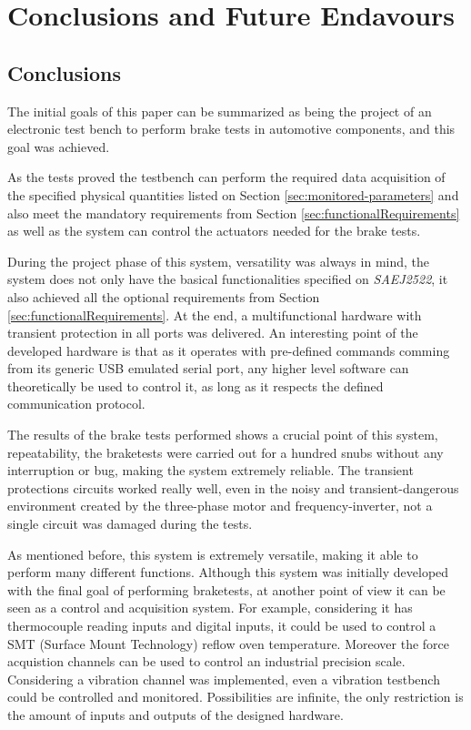 \chapter{Conclusions and Future Endavours}\label{ch:conclusions-and-future-endavours}
	
	\section{Conclusions}\label{sec:conclusions}

		The initial goals of this paper can be summarized as being the project of an electronic test bench to perform brake tests in automotive components, and this goal was achieved.
		\par
		As the tests proved the testbench can perform the required data acquisition of the specified physical quantities listed on Section \ref{sec:monitored-parameters} and also meet the mandatory requirements from Section \ref{sec:functionalRequirements} as well as the system can control the actuators needed for the brake tests.
		\par
		During the project phase of this system, versatility was always in mind, the system does not only have the basical functionalities specified on \textit{SAEJ2522}, it also achieved all the optional requirements from Section \ref{sec:functionalRequirements}. At the end, a multifunctional hardware with transient protection in all ports was delivered. An interesting point of the developed hardware is that as it operates with pre-defined commands comming from its generic USB emulated serial port, any higher level software can theoretically be used to control it, as long as it respects the defined communication protocol.
		\par
		The results of the brake tests performed shows a crucial point of this system, repeatability, the braketests were carried out for a hundred snubs without any interruption or bug, making the system extremely reliable. The transient protections circuits worked really well, even in the noisy and transient-dangerous environment created by the three-phase motor and frequency-inverter, not a single circuit was damaged during the tests.
		\par
		As mentioned before, this system is extremely versatile, making it able to perform many different functions. Although this system was initially developed with the final goal of performing braketests, at another point of view it can be seen as a control and acquisition system. For example, considering it has thermocouple reading inputs and digital inputs, it could be used to control a SMT (Surface Mount Technology)  reflow oven temperature. Moreover the force acquistion channels can be used to control an industrial precision scale. Considering a vibration channel was implemented, even a vibration testbench could be controlled and monitored. Possibilities are infinite, the only restriction is the amount of inputs and outputs of the designed hardware.

